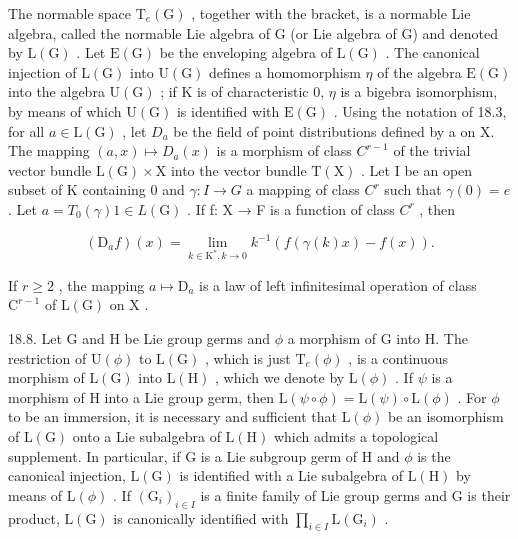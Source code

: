 The normable space \(\mathrm{T}_{e}(\mathrm{G})\) , together with the bracket, is a normable Lie algebra, called the normable Lie algebra of G (or Lie algebra of G) and denoted by \(\mathrm{L}(\mathrm{G})\) . Let \(\mathrm{E}(\mathrm{G})\) be the enveloping algebra of \(\mathrm{L}(\mathrm{G})\) . The canonical injection of \(\mathrm{L}(\mathrm{G})\) into \(\mathrm{U}(\mathrm{G})\) defines a homomorphism \(\eta\) of the algebra \(\mathrm{E}(\mathrm{G})\) into the algebra \(\mathrm{U}(\mathrm{G})\) ; if K is of characteristic 0, \(\eta\) is a bigebra isomorphism, by means of which \(\mathrm{U}(\mathrm{G})\) is identified with \(\mathrm{E}(\mathrm{G})\) . Using the notation of 18.3, for all \(a \in \mathrm{L}(\mathrm{G})\) , let \(D_{a}\) be the field of point distributions defined by a on X. The mapping \((a, x) \mapsto D_{a}(x)\) is a morphism of class \(C^{r-1}\) of the trivial vector bundle \(\mathrm{L}(\mathrm{G}) \times \mathrm{X}\) into the vector bundle \(\mathrm{T}(\mathrm{X})\) . Let I be an open subset of K containing 0 and \(\gamma: I \to G\) a mapping of class \(C^{r}\) such that \(\gamma(0) = e\) . Let \(a = T_{0}(\gamma) 1 \in L(\mathrm{G})\) . If f: X → F is a function of class \(C^{r}\) , then

\[
\left(\mathrm{D} _ {a} f\right) (x) = \lim _ {k \in \mathrm{K} ^ {*}, k \rightarrow 0} k ^ {- 1} \left(f (\gamma (k) x) - f (x)\right).
\]

If \(r \geqslant 2\) , the mapping \(a \mapsto \mathrm{D}_a\) is a law of left infinitesimal operation of class \(\mathrm{C}^{r-1}\) of \(\mathrm{L}(\mathrm{G})\) on \(\mathrm{X}\) .

18.8. Let G and H be Lie group germs and \(\phi\) a morphism of G into H. The restriction of \(\mathrm{U}(\phi)\) to \(\mathrm{L}(\mathrm{G})\) , which is just \(\mathrm{T}_{e}(\phi)\) , is a continuous morphism of \(\mathrm{L}(\mathrm{G})\) into \(\mathrm{L}(\mathrm{H})\) , which we denote by \(\mathrm{L}(\phi)\) . If \(\psi\) is a morphism of H into a Lie group germ, then \(\mathrm{L}(\psi \circ \phi) = \mathrm{L}(\psi) \circ \mathrm{L}(\phi)\) . For \(\phi\) to be an immersion, it is necessary and sufficient that \(\mathrm{L}(\phi)\) be an isomorphism of \(\mathrm{L}(\mathrm{G})\) onto a Lie subalgebra of \(\mathrm{L}(\mathrm{H})\) which admits a topological supplement. In particular, if G is a Lie subgroup germ of H and \(\phi\) is the canonical injection, \(\mathrm{L}(\mathrm{G})\) is identified with a Lie subalgebra of \(\mathrm{L}(\mathrm{H})\) by means of \(\mathrm{L}(\phi)\) . If \((\mathrm{G}_{i})_{i\in I}\) is a finite family of Lie group germs and G is their product, \(\mathrm{L}(\mathrm{G})\) is canonically identified with \(\prod_{i\in I}\mathrm{L}(\mathrm{G}_{i})\) .

